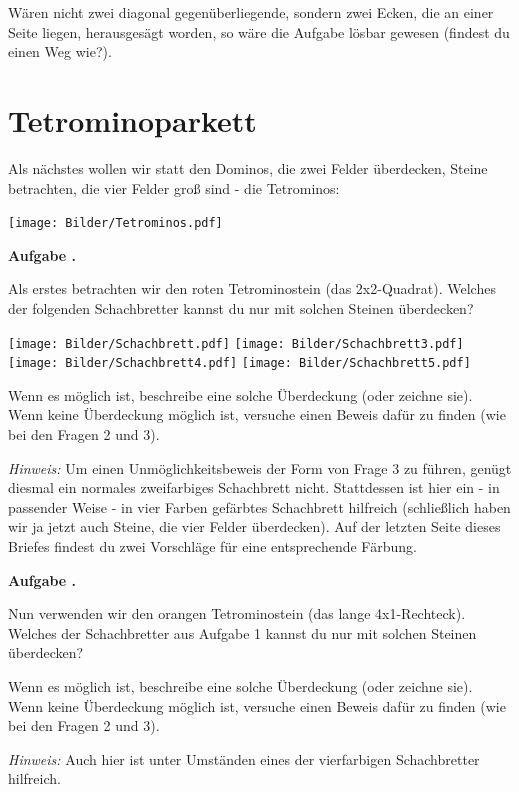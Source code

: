 \documentclass[a4paper,ngerman,12pt]{scrartcl}
\theoremstyle{definition}
\theoremstyle{plain}
\theoremstyle{remark}
\newlength{\aufgabenskip}
\newcounter{aufgabennummer}
\newenvironment{aufgabe}[1]{
	\addtocounter{aufgabennummer}{1}
	\textbf{Aufgabe \theaufgabennummer.} \emph{#1} \par
}{\vspace{\aufgabenskip}}
\begin{document}
Wären nicht zwei diagonal gegenüberliegende, sondern zwei Ecken, die an einer Seite liegen, herausgesägt worden, so wäre die Aufgabe lösbar gewesen (findest du einen Weg wie?).

\section{Tetrominoparkett}

Als nächstes wollen wir statt den Dominos, die zwei Felder überdecken, Steine betrachten, die vier Felder groß sind - die Tetrominos:

\begin{center}
	\texttt{[image: Bilder/Tetrominos.pdf]}
\end{center}

\begin{aufgabe}{}
	Als erstes betrachten wir den roten Tetrominostein (das 2x2-Quadrat). Welches der folgenden Schachbretter kannst du nur mit solchen Steinen überdecken? 
	
	\begin{center}
		\texttt{[image: Bilder/Schachbrett.pdf]}
		\texttt{[image: Bilder/Schachbrett3.pdf]}
		\texttt{[image: Bilder/Schachbrett4.pdf]}
		\texttt{[image: Bilder/Schachbrett5.pdf]}
	\end{center}
	
	Wenn es möglich ist, beschreibe eine solche Überdeckung (oder zeichne sie). Wenn keine Überdeckung möglich ist, versuche einen Beweis dafür zu finden (wie bei den Fragen 2 und 3).
	
	\emph{Hinweis:} Um einen Unmöglichkeitsbeweis der Form von Frage 3 zu führen, genügt diesmal ein normales zweifarbiges Schachbrett nicht. Stattdessen ist hier ein - in passender Weise - in vier Farben gefärbtes \glqq Schachbrett\grqq{} hilfreich (schließlich haben wir ja jetzt auch Steine, die vier Felder überdecken). Auf der letzten Seite dieses Briefes findest du zwei Vorschläge für eine entsprechende Färbung.
\end{aufgabe}

\begin{aufgabe}{}
	Nun verwenden wir den orangen Tetrominostein (das lange 4x1-Rechteck). Welches der Schachbretter aus Aufgabe 1 kannst du nur mit solchen Steinen überdecken? 
	
	Wenn es möglich ist, beschreibe eine solche Überdeckung (oder zeichne sie). Wenn keine Überdeckung möglich ist, versuche einen Beweis dafür zu finden (wie bei den Fragen 2 und 3).
	
	\emph{Hinweis:} Auch hier ist unter Umständen eines der vierfarbigen \glqq Schachbretter\grqq{} hilfreich.
\end{aufgabe}
\end{document}
